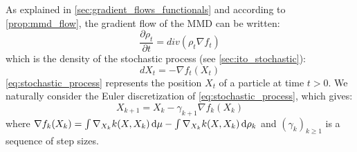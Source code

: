 As explained in \cref{sec:gradient_flows_functionals} and according to \cref{prop:mmd_flow}, the gradient flow of the MMD can be written:
\begin{equation*}
\frac{\partial \rho_t}{\partial t}= div(\rho_t  \nabla f_t)
\end{equation*}
which is the density of the stochastic process (see \cref{sec:ito_stochastic}):
\begin{equation}\label{eq:stochastic_process}
dX_t=-\nabla f_t(X_t) 
\end{equation}
\eqref{eq:stochastic_process} represents the position $X_t$ of a particle at time $t > 0$.
We naturally consider the Euler discretization of \eqref{eq:stochastic_process}, which gives:
\begin{equation}\label{eq:discretization}
X_{k+1}=X_k - \gamma_{k+1} \nabla f_k(X_k)
\end{equation}
where $\nabla f_k(X_k)= \int \nabla_{X_k}k(X,X_k)\mathop{}\!\mathrm{d} \mu - \int \nabla_{X_k}k(X,X_k) \mathop{}\!\mathrm{d} \rho_k$ and $(\gamma_k)_{k\ge1}$ is a sequence of step sizes.




